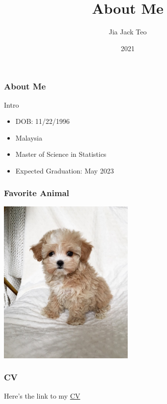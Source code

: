 \documentclass{beamer}
\title{About Me}
\author{Jia Jack Teo}
\date{2021}
\begin{document}
\frame{\titlepage}

\begin{frame}
\frametitle{About Me}
Intro
\begin{itemize}
 \item DOB: 11/22/1996
 \item Malaysia
 \item Master of Science in Statistics
 \item Expected Graduation: May 2023
\end{itemize}
\end{frame}

\begin{frame}
\frametitle{Favorite Animal}
\centering
\includegraphics[width=0.5\textwidth]{images/maltipoo}
\end{frame}

\begin{frame}
\frametitle{CV}
Here's the link to my \href{https://github.com/stat850-unl/11-presentation-jiajackteo96/blob/master/cv.pdf}{CV}
\end{frame}
\end{document}
